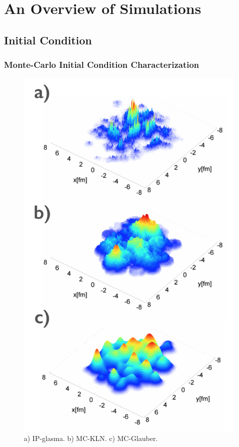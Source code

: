

\section{An Overview of Simulations}

\subsection{Initial Condition}
\subsubsection{Monte-Carlo Initial Condition Characterization}
\begin{figure}[h!]
\begin{center}
\includegraphics[width=0.45\linewidth]{figs/initial_conditions.png}
\caption{ a) IP-glasma. b) MC-KLN. c) MC-Glauber.}
\end{center}
\end{figure}

